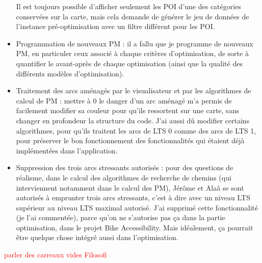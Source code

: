 \begin{itemize}
    Il est toujours possible d'afficher seulement les POI d'une des catégories conservées sur la carte, mais cela demande de générer le jeu de données de l'instance pré-optimisation avec un filtre différent pour les POI.
    \item Programmation de nouveaux PM : il a fallu que je programme de nouveaux PM, en particuler ceux associé à chaque critères d'optimisation, de sorte à quantifier le avant-après de chaque optimisation (ainsi que la qualité des différents modèles d'optimisation). 
    \item Traitement des arcs aménagés par le visualisateur et par les algorithmes de calcul de PM : mettre à 0 le danger d'un arc aménagé m'a permis de facilement modifier sa couleur pour qu'ils ressortent sur une carte, sans changer en profondeur la structure du code. J'ai aussi dû modifier certains algorithmes, pour qu'ils traitent les arcs de LTS 0 comme des arcs de LTS 1, pour préserver le bon fonctionnement des fonctionnalités qui étaient déjà implémentées dans l'application.
    \item Suppression des trois arcs stressants autorisés : pour des questions de réalisme, dans le calcul des algorithmes de recherche de chemins (qui interviennent notamment dans le calcul des PM), Jérôme et Alaâ se sont autorisés à emprunter trois arcs stressants, c'est à dire avec un niveau LTS supérieur au niveau LTS maximal autorisé. J'ai supprimé cette fonctionnalité (je l'ai commentée), parce qu'on ne s'autorise pas ça dans la partie optimisation, dans le projet Bike Accessibility. Mais idéalement, ça pourrait être quelque chose intégré aussi dans l'optimisation.
\end{itemize}

\textcolor{red}{parler des carreaux vides Filosofi}